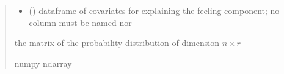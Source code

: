 \documentclass[letterpaper,10pt,english]{sphinxmanual}
\begin{document}
\begin{fulllineitems}
\begin{quote}
\begin{description}
\begin{itemize}
\item {} 
\sphinxAtStartPar
{} () \textendash{} dataframe of covariates for explaining the feeling component;
no column must be named  nor 

\end{itemize}

\sphinxAtStartPar
the matrix of the probability distribution of dimension \(n \times r\)

\sphinxAtStartPar
numpy ndarray

\end{description}\end{quote}

\end{fulllineitems}

\end{document}
